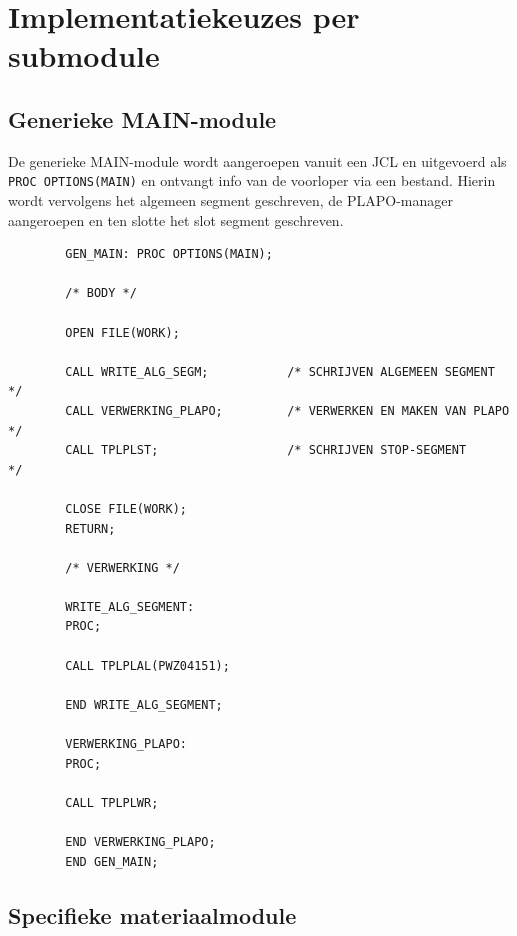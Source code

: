 \section{Implementatiekeuzes per submodule}
\label{sec:poc-implementatie}

\subsection{Generieke MAIN-module}
\label{subsec:poc-generiek}

De generieke MAIN-module wordt aangeroepen vanuit een JCL en uitgevoerd als \texttt{PROC OPTIONS(MAIN)} en ontvangt info van de voorloper via een bestand.
Hierin wordt vervolgens het algemeen segment geschreven, de PLAPO-manager aangeroepen en ten slotte het slot segment geschreven.

\begin{listing}[h]
    \caption[Skelet generieke MAIN-module in PL/I]{Skelet van de generieke MAIN-module in PL/I (verkort).}
    \label{lst:poc-generiek}
    \begin{verbatim}
        GEN_MAIN: PROC OPTIONS(MAIN);

        /* BODY */

        OPEN FILE(WORK);
        
        CALL WRITE_ALG_SEGM;           /* SCHRIJVEN ALGEMEEN SEGMENT   */
        CALL VERWERKING_PLAPO;         /* VERWERKEN EN MAKEN VAN PLAPO */
        CALL TPLPLST;                  /* SCHRIJVEN STOP-SEGMENT       */

        CLOSE FILE(WORK);
        RETURN;

        /* VERWERKING */
        
        WRITE_ALG_SEGMENT:
        PROC;
        
        CALL TPLPLAL(PWZ04151);
        
        END WRITE_ALG_SEGMENT;
        
        VERWERKING_PLAPO:
        PROC;
        
        CALL TPLPLWR;
        
        END VERWERKING_PLAPO;
        END GEN_MAIN;
    \end{verbatim}
\end{listing}

\subsection{Specifieke materiaalmodule}
\label{subsec:poc-baf-main}

